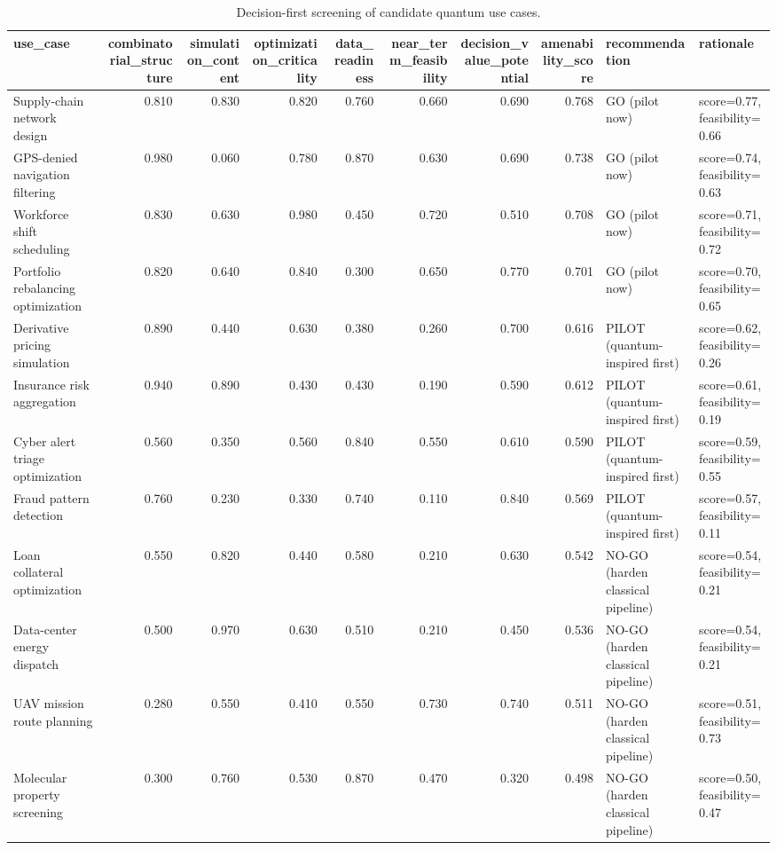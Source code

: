 \begin{table}
\caption{Decision-first screening of candidate quantum use cases.}
\label{tab:screening}
\begin{tabular}{lrrrrrrrll}
\toprule
use\_case & combinatorial\_structure & simulation\_content & optimization\_criticality & data\_readiness & near\_term\_feasibility & decision\_value\_potential & amenability\_score & recommendation & rationale \\
\midrule
Supply-chain network design & 0.810 & 0.830 & 0.820 & 0.760 & 0.660 & 0.690 & 0.768 & GO (pilot now) & score=0.77, feasibility=0.66 \\
GPS-denied navigation filtering & 0.980 & 0.060 & 0.780 & 0.870 & 0.630 & 0.690 & 0.738 & GO (pilot now) & score=0.74, feasibility=0.63 \\
Workforce shift scheduling & 0.830 & 0.630 & 0.980 & 0.450 & 0.720 & 0.510 & 0.708 & GO (pilot now) & score=0.71, feasibility=0.72 \\
Portfolio rebalancing optimization & 0.820 & 0.640 & 0.840 & 0.300 & 0.650 & 0.770 & 0.701 & GO (pilot now) & score=0.70, feasibility=0.65 \\
Derivative pricing simulation & 0.890 & 0.440 & 0.630 & 0.380 & 0.260 & 0.700 & 0.616 & PILOT (quantum-inspired first) & score=0.62, feasibility=0.26 \\
Insurance risk aggregation & 0.940 & 0.890 & 0.430 & 0.430 & 0.190 & 0.590 & 0.612 & PILOT (quantum-inspired first) & score=0.61, feasibility=0.19 \\
Cyber alert triage optimization & 0.560 & 0.350 & 0.560 & 0.840 & 0.550 & 0.610 & 0.590 & PILOT (quantum-inspired first) & score=0.59, feasibility=0.55 \\
Fraud pattern detection & 0.760 & 0.230 & 0.330 & 0.740 & 0.110 & 0.840 & 0.569 & PILOT (quantum-inspired first) & score=0.57, feasibility=0.11 \\
Loan collateral optimization & 0.550 & 0.820 & 0.440 & 0.580 & 0.210 & 0.630 & 0.542 & NO-GO (harden classical pipeline) & score=0.54, feasibility=0.21 \\
Data-center energy dispatch & 0.500 & 0.970 & 0.630 & 0.510 & 0.210 & 0.450 & 0.536 & NO-GO (harden classical pipeline) & score=0.54, feasibility=0.21 \\
UAV mission route planning & 0.280 & 0.550 & 0.410 & 0.550 & 0.730 & 0.740 & 0.511 & NO-GO (harden classical pipeline) & score=0.51, feasibility=0.73 \\
Molecular property screening & 0.300 & 0.760 & 0.530 & 0.870 & 0.470 & 0.320 & 0.498 & NO-GO (harden classical pipeline) & score=0.50, feasibility=0.47 \\
\bottomrule
\end{tabular}
\end{table}
